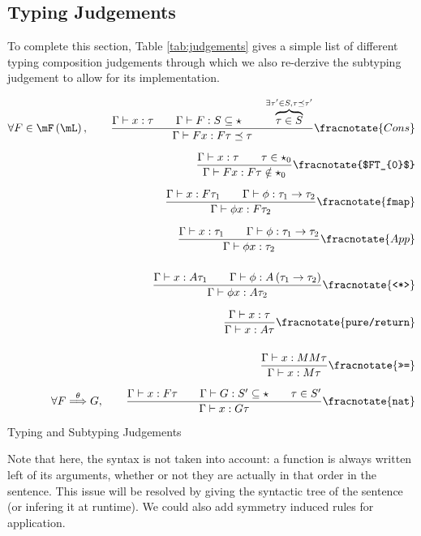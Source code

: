 \documentclass[math, english, info]{cours}
\def\cont{\Gamma\vdash}
\def\poulpe{\qquad}
\begin{document}
\subsection{Typing Judgements}\label{subsec:judgements}
To complete this section, Table \ref{tab:judgements} gives a simple list of different typing composition judgements through which we also re-derzive the subtyping judgement to allow for its implementation.
\begin{table}
	\begin{align*}
		\forall F \in \mF\left( \mL \right),\poulpe
		\frac{\cont x: \tau \poulpe \cont F: S\subseteq \star \poulpe \overbrace{\tau \in S}^{\exists \tau'\in S, \tau \preceq \tau'}}{\cont Fx: F\tau \preceq \tau}\fracnotate{Cons} \\[.25cm]
		\frac{\cont x: \tau \poulpe \tau \in \star_{0}}{\cont Fx: F\tau \notin \star_{0}}\fracnotate{$FT_{0}$}                                                                        \\[.25cm]
		\frac{\cont x: F\tau_{1} \poulpe \cont \phi: \tau_{1} \to \tau_{2}}{\cont \phi x: F\tau_{2} }\fracnotate{\texttt{fmap}}                                                       \\[.25cm]
		\frac{\cont x: \tau_{1} \poulpe \cont \phi: \tau_{1} \to \tau_{2}}{\cont \phi x: \tau_{2}}\fracnotate{App}                                                                    \\[.5cm]
		\frac{\cont x: A\tau_{1} \poulpe \cont \phi: A\left( \tau_{1} \to \tau_{2} \right)}{\cont \phi x: A\tau_{2}}\fracnotate{\texttt{<*>}}                                         \\[.25cm]
		\frac{\cont x: \tau}{\cont x: A\tau}\fracnotate{\texttt{pure/return}}                                                                                                         \\[.5cm]
		\frac{\cont x: MM\tau}{\cont x: M\tau}\fracnotate{\texttt{>>=}}                                                                                                               \\[.25cm]
		\forall F \overset{\theta}{\Longrightarrow} G,\poulpe \frac{\cont x: F\tau \poulpe \cont G: S' \subseteq \star \poulpe \tau \in S'}{\cont x : G\tau}\fracnotate{\texttt{nat}}
	\end{align*}
	\caption{Typing and Subtyping Judgements}
	\label{tab:judgements}
\end{table}
Note that here, the syntax is not taken into account: a function is always written left of its arguments, whether or not they are actually in that order in the sentence.
This issue will be resolved by giving the syntactic tree of the sentence (or infering it at runtime).
We could also add symmetry induced rules for application.
\end{document}
